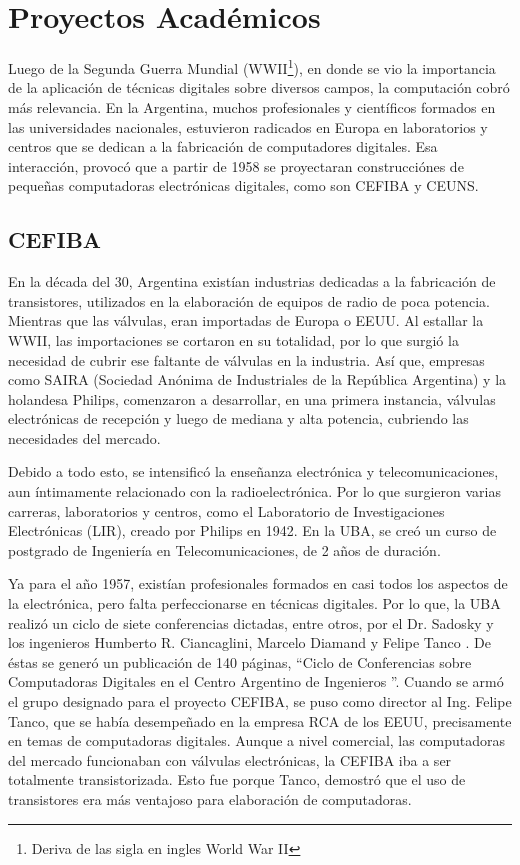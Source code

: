 \documentclass[%
 	final,
%
	notitlepage,
	narroweqnarray,
	inline,
 	twoside,
	]{ieee}
\begin{document}
\section{Proyectos Acad\'emicos}
Luego de la Segunda Guerra Mundial (WWII\footnote{Deriva de las sigla en ingles World War II}), en donde se vio la importancia de la aplicaci\'on de t\'ecnicas digitales sobre diversos campos, la computaci\'on cobr\'o m\'as relevancia. En la Argentina, muchos profesionales y cient\'ificos formados en las universidades nacionales, estuvieron radicados en Europa en laboratorios y centros que se dedican a la fabricaci\'on de computadores digitales. Esa interacci\'on, provoc\'o que a partir de 1958 se proyectaran construcci\'ones de peque\~nas computadoras electr\'onicas digitales, como son CEFIBA y CEUNS.

\subsection*{CEFIBA}

En la d\'ecada del 30, Argentina exist\'ian industrias dedicadas a la fabricaci\'on de transistores, utilizados en la elaboraci\'on de equipos de radio de poca potencia. Mientras que las v\'alvulas, eran importadas de Europa o EEUU. Al estallar la WWII, las importaciones se cortaron en su totalidad, por lo que surgi\'o la necesidad de cubrir ese faltante de v\'alvulas en la industria. As\'i que, empresas como SAIRA (Sociedad An\'onima de Industriales de la Rep\'ublica Argentina) y la holandesa Philips, comenzaron a desarrollar, en una primera instancia, v\'alvulas electr\'onicas de recepci\'on y luego de mediana y alta potencia, cubriendo las necesidades del mercado.

Debido a todo esto, se intensific\'o la ense\~nanza electr\'onica y telecomunicaciones, aun \'intimamente relacionado con la radioelectr\'onica. Por lo que surgieron varias carreras, laboratorios y centros, como el Laboratorio de Investigaciones Electr\'onicas (LIR), creado por Philips en 1942. En la UBA, se cre\'o un curso de postgrado de Ingenier\'ia en Telecomunicaciones, de 2 a\~nos de duraci\'on.

Ya para el a\~no 1957, exist\'ian profesionales formados en casi todos los aspectos de la electr\'onica, pero falta perfeccionarse en t\'ecnicas digitales. Por lo que, la UBA realiz\'o un ciclo de siete conferencias dictadas, entre otros, por el Dr. Sadosky y los ingenieros Humberto R. Ciancaglini, Marcelo Diamand y Felipe Tanco . De \'estas se gener\'o un publicaci\'on de 140 p\'aginas, “Ciclo de Conferencias sobre Computadoras Digitales en el Centro Argentino de Ingenieros ”.
Cuando se arm\'o el grupo designado para el proyecto CEFIBA, se puso como director al Ing. Felipe Tanco, que se hab\'ia desempe\~nado en la empresa RCA de los EEUU, precisamente en temas de computadoras digitales. Aunque a nivel comercial, las computadoras del mercado funcionaban con v\'alvulas electr\'onicas, la CEFIBA iba a ser totalmente transistorizada. Esto fue porque Tanco, demostr\'o que el uso de transistores era m\'as ventajoso para elaboraci\'on de computadoras.
\end{document}
